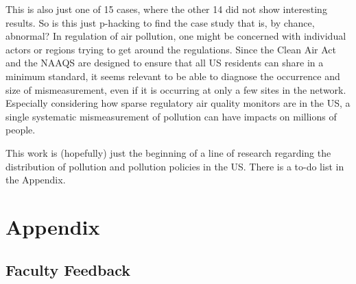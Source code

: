 \documentclass[12pt]{article}
\begin{document}
This is also just one of 15 cases, where the other 14 did not show interesting results. So is this just p-hacking to find the case study that is, by chance, abnormal? In regulation of air pollution, one might be concerned with individual actors or regions trying to get around the regulations. Since the Clean Air Act and the NAAQS are designed to ensure that all US residents can share in a minimum standard, it seems relevant to be able to diagnose the occurrence and size of mismeasurement, even if it is occurring at only a few sites in the network. Especially considering how sparse regulatory air quality monitors are in the US, a single systematic mismeasurement of pollution can have impacts on millions of people.

This work is (hopefully) just the beginning of a line of research regarding the distribution of pollution and pollution policies in the US. There is a to-do list in the Appendix.











\newpage


% 
%



\newpage
\section{Appendix}

\subsection{Faculty Feedback} \label{sec:faculty_feedback}



\newpage
\end{document}
